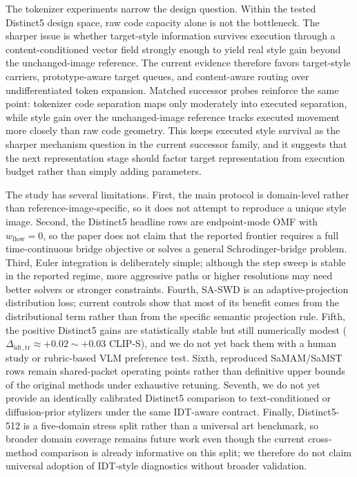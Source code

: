 \documentclass[letterpaper]{article}
\begin{document}
The tokenizer experiments narrow the design question. Within the tested Distinct5 design space, raw code capacity alone is not the bottleneck. The sharper issue is whether target-style information survives execution through a content-conditioned vector field strongly enough to yield real style gain beyond the unchanged-image reference. The current evidence therefore favors target-style carriers, prototype-aware target queues, and content-aware routing over undifferentiated token expansion. Matched successor probes reinforce the same point: tokenizer code separation maps only moderately into executed separation, while style gain over the unchanged-image reference tracks executed movement more closely than raw code geometry. This keeps executed style survival as the sharper mechanism question in the current successor family, and it suggests that the next representation stage should factor target representation from execution budget rather than simply adding parameters.

The study has several limitations. First, the main protocol is domain-level rather than reference-image-specific, so it does not attempt to reproduce a unique style image. Second, the Distinct5 headline rows are endpoint-mode OMF with $w_{\mathrm{flow}}=0$, so the paper does not claim that the reported frontier requires a full time-continuous bridge objective or solves a general Schrodinger-bridge problem. Third, Euler integration is deliberately simple; although the step sweep is stable in the reported regime, more aggressive paths or higher resolutions may need better solvers or stronger constraints. Fourth, SA-SWD is an adaptive-projection distribution loss; current controls show that most of its benefit comes from the distributional term rather than from the specific semantic projection rule. Fifth, the positive Distinct5 gains are statistically stable but still numerically modest ($\Delta_{\mathrm{idt,tr}}\approx +0.02\sim+0.03$ CLIP-S), and we do not yet back them with a human study or rubric-based VLM preference test. Sixth, reproduced SaMAM/SaMST rows remain shared-packet operating points rather than definitive upper bounds of the original methods under exhaustive retuning. Seventh, we do not yet provide an identically calibrated Distinct5 comparison to text-conditioned or diffusion-prior stylizers under the same IDT-aware contract. Finally, Distinct5-512 is a five-domain stress split rather than a universal art benchmark, so broader domain coverage remains future work even though the current cross-method comparison is already informative on this split; we therefore do not claim universal adoption of IDT-style diagnostics without broader validation.
\end{document}
